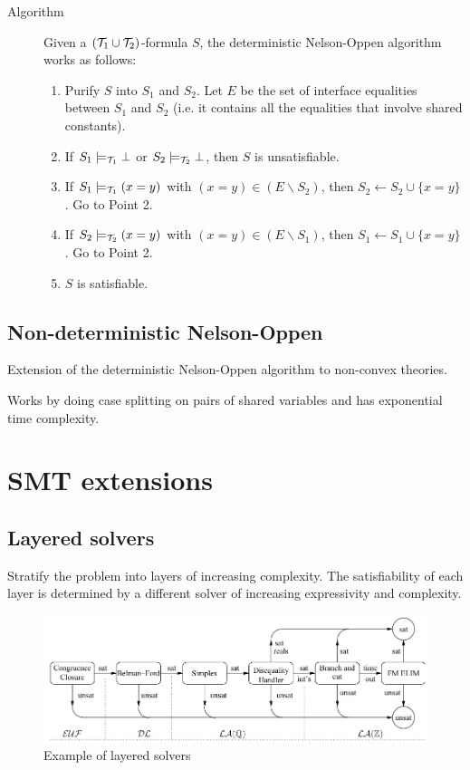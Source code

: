 \begin{description}
    \item[Algorithm] 
    Given a $(\mathcal{T}_1 \cup \mathcal{T}_2)$-formula $S$,
    the deterministic Nelson-Oppen algorithm works as follows:
    \begin{enumerate}
        \item Purify $S$ into $S_1$ and $S_2$. 
            Let $E$ be the set of interface equalities between $S_1$ and $S_2$ (i.e. it contains all the equalities that involve shared constants).
        \item If $S_1 \models_{\mathcal{T}_1} \bot$ or $S_2 \models_{\mathcal{T}_2} \bot$, then $S$ is unsatisfiable.
        \item If $S_1 \models_{\mathcal{T}_1} (x = y)$ with $(x = y) \in (E \smallsetminus S_2)$, then $S_2 \leftarrow S_2 \cup \{ x = y \}$. Go to Point 2.
        \item If $S_2 \models_{\mathcal{T}_2} (x = y)$ with $(x = y) \in (E \smallsetminus S_1)$, then $S_1 \leftarrow S_1 \cup \{ x = y \}$. Go to Point 2.
        \item $S$ is satisfiable.
    \end{enumerate}
\end{description}


\subsection{Non-deterministic Nelson-Oppen}

Extension of the deterministic Nelson-Oppen algorithm to non-convex theories.

Works by doing case splitting on pairs of shared variables and has exponential time complexity.



\section{SMT extensions}


\subsection{Layered solvers}

Stratify the problem into layers of increasing complexity.
The satisfiability of each layer is determined by a different solver of increasing expressivity and complexity.

\begin{figure}[H]
    \centering
    \includegraphics[width=0.7\linewidth]{./img/_layered_solvers.pdf}
    \caption{Example of layered solvers}
\end{figure}


